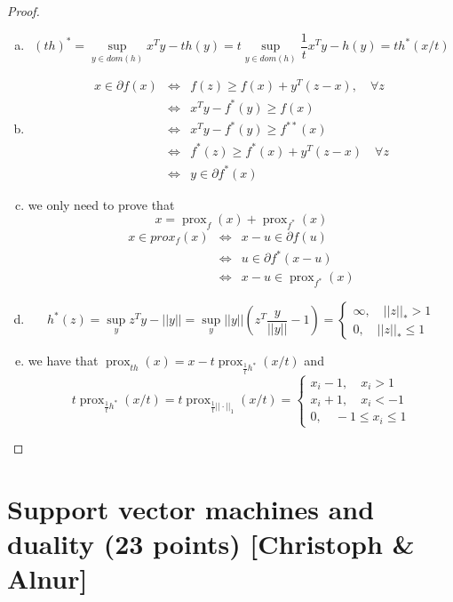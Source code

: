 \documentclass{article}
\theoremstyle{remark}
\theoremstyle{definition}
\newcommand{\prox}{\operatorname{prox}}
\begin{document}
\begin{proof}
\begin{enumerate}[(a)]
    \item \[(th)^*=\sup_{y\in dom(h)}x^Ty-th(y)=t\sup_{y\in dom(h)}\frac{1}{t}x^Ty-h(y)=th^*(x/t)\]
    \item \begin{eqnarray*}
        x \in \partial f(x) &\iff & f(z)\geq f(x)+y^T(z-x),\quad \forall z\\
         & \iff & x^Ty- f^*(y)\geq f(x)\\
         & \iff & x^Ty - f^*(y)\geq f^{**}(x)\\
         & \iff & f^*(z)\geq f^*(x)+y^T(z-x) \quad \forall z\\
         & \iff & y \in \partial f^*(x)
        \end{eqnarray*}
\item we only need to prove that 
\[x= \prox_f(x)+\prox_{f^*}(x)\]
  \begin{eqnarray*}
      x \in prox_f(x) & \iff & x-u\in \partial f(u)\\
                      & \iff &  u \in \partial f^*(x-u)\\
                      & \iff & x-u \in \prox_{f^*}(x)
  \end{eqnarray*}
\item \[h^*(z)=\sup_{y} z^Ty-||y||=\sup_{y} ||y||(z^T\frac{y}{||y||}-1)=\begin{cases}
   \infty, \quad ||z||_*>1\\
   0, \quad ||z||_*\leq 1 \end{cases}\]
\item  we have that $\prox_{th}(x) = x- t\prox_{\frac{1}{t}h^*}(x/t)$ and 
   \[t\prox_{\frac{1}{t}h^*}(x/t)=t\prox_{\frac{1}{t}||\cdot||_1}(x/t)=\begin{cases}
       x_i-1,\quad x_i>1\\
       x_i+1,\quad x_i<-1\\
       0,\quad -1\leq x_i\leq 1\end{cases}\]
\end{enumerate}





\end{proof}

\section{Support vector machines and duality (23 points) [Christoph \& Alnur]}
\end{document}
